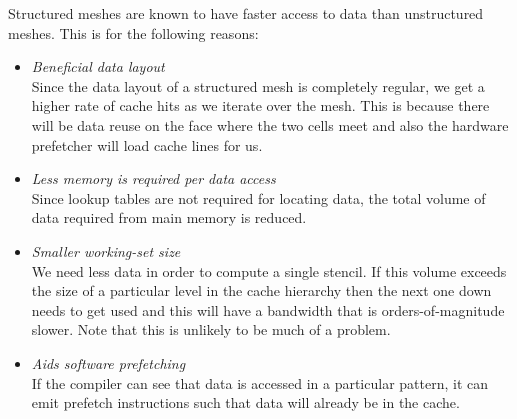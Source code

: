 Structured meshes are known to have faster access to data than unstructured meshes.
This is for the following reasons:

\begin{itemize}
  \item
    \textit{Beneficial data layout} \\
    Since the data layout of a structured mesh is completely regular, we get a higher rate of cache hits as we iterate over the mesh.
    This is because there will be data reuse on the face where the two cells meet and also the hardware prefetcher will load cache lines for us.

  \item
    \textit{Less memory is required per data access} \\
    Since lookup tables are not required for locating data, the total volume of data required from main memory is reduced.

  \item
    \textit{Smaller working-set size} \\
    We need less data in order to compute a single stencil.
    If this volume exceeds the size of a particular level in the cache hierarchy then the next one down needs to get used and this will have a bandwidth that is orders-of-magnitude slower.
    Note that this is unlikely to be much of a problem.

  \item
    \textit{Aids software prefetching} \\
    If the compiler can see that data is accessed in a particular pattern, it can emit prefetch instructions such that data will already be in the cache.
\end{itemize}

